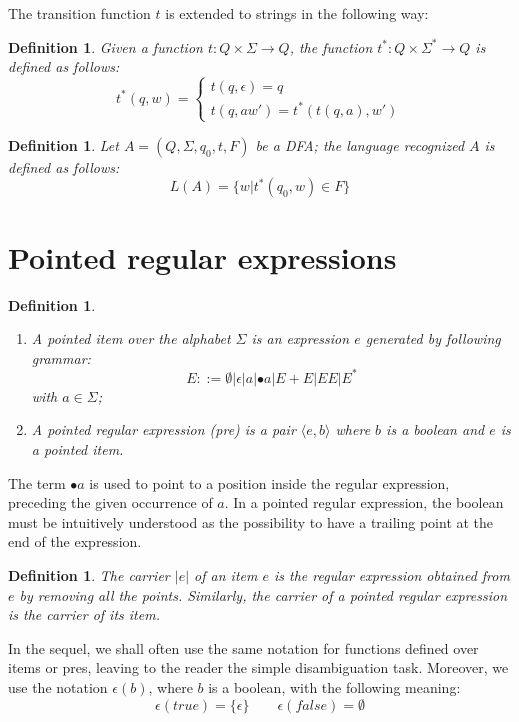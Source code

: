 \documentclass[preprint]{sigplanconf}
\newcommand{\true}{\mathit{true}}
\newcommand{\false}{\mathit{false}}
\newcounter{item}
\newtheorem{definition}[item]{Definition}
\begin{document}
\noindent
The transition function $t$ is extended to strings in the following way:

\begin{definition}Given a function $t:Q \times \Sigma \to Q$, 
the function $t^*:Q \times \Sigma^* \to Q$ is defined as follows:
\[t^*(q,w) = \begin{cases} t(q,\epsilon) = q \\ t(q,aw') = t^*(t(q,a),w')
\end{cases}\]
\end{definition}

\begin{definition}
Let $A=(Q,\Sigma,q_0,t,F)$ be a DFA; the language recognized 
$A$ is defined as follows:
\[L(A) = \{w | t^*(q_0,w) \in F \} \]
\end{definition}

\section{Pointed regular expressions}

\begin{definition}\ \label{def:pre}
\begin{enumerate}
\item A {\em pointed item} over the alphabet $\Sigma$ is 
an expression $e$ generated by following grammar:
\[E ::= \emptyset | \epsilon | a | \bullet a | E+E | EE | E^* \]
with $a \in \Sigma$;
\item A {\em pointed regular expression} (pre) is a pair 
$\langle e,b \rangle$ where $b$ is a boolean and $e$ is a 
pointed item.
\end{enumerate}
\end{definition}
The term $\bullet a$ is used to point to a position inside the regular
expression, preceding the given occurrence of $a$. 
In a pointed regular expression, 
the boolean must be intuitively understood as the possibility to have
a trailing point at the end of the expression. 

\begin{definition} \label{def:carrier}
The {\em carrier} $|e|$ of an item $e$
is the regular expression obtained from $e$ by removing all the points.
Similarly, the {\em carrier} of a pointed regular expression is the 
carrier of its item.
\end{definition}
In the sequel, we shall often use the same notation for functions
defined over items or pres, leaving to the reader the simple 
disambiguation task. Moreover, we use the notation $\epsilon(b)$, where $b$ 
is a boolean, with the following meaning:
\[\epsilon(\true)=\{\epsilon\}\quad\quad \epsilon(\false)=\emptyset\]
\end{document}
